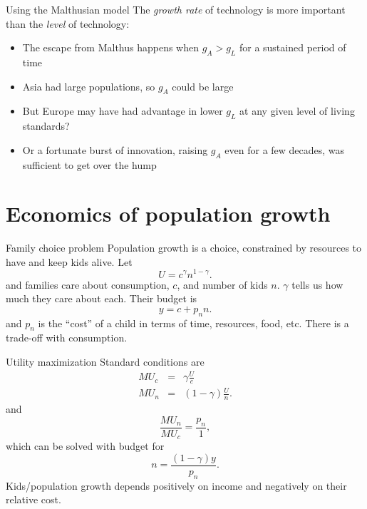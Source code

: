 \begin{frame}{Using the Malthusian model}
The \textit{growth rate} of technology is more important than the \textit{level} of technology:
\begin{itemize}
	\item The escape from Malthus happens when $g_A > g_L$ for a sustained period of time
	\item Asia had large populations, so $g_A$ could be large
	\item But Europe may have had advantage in lower $g_L$ at any given level of living standards?
	\item Or a fortunate burst of innovation, raising $g_A$ even for a few decades, was sufficient to get over the hump
\end{itemize}
\end{frame}

\section{Economics of population growth}
\begin{frame}{Family choice problem}
Population growth is a choice, constrained by resources to have and keep kids alive. Let
\begin{equation}
	U = c^{\gamma}n^{1-\gamma}. \nonumber
\end{equation}
and families care about consumption, $c$, and number of kids $n$. $\gamma$ tells us how much they care about each. Their budget is
\begin{equation}
	y = c + p_n n. \label{EQ_budget_malthus}
\end{equation}
and $p_n$ is the ``cost'' of a child in terms of time, resources, food, etc. There is a trade-off with consumption. 
\end{frame}

\begin{frame}{Utility maximization}
Standard conditions are
\begin{eqnarray}
	MU_c &=& \gamma \frac{U}{c} \nonumber \\ 
	MU_n &=& (1-\gamma) \frac{U}{n}. \nonumber
\end{eqnarray}
and 
\begin{equation}
	\frac{MU_n}{MU_c} = \frac{p_n}{1}, \nonumber
\end{equation}
which can be solved with budget for
\begin{equation}
	n = \frac{(1-\gamma)y}{p_n}. \label{EQ_n_equil}
\end{equation}
Kids/population growth depends positively on income and negatively on their relative cost.
\end{frame}

